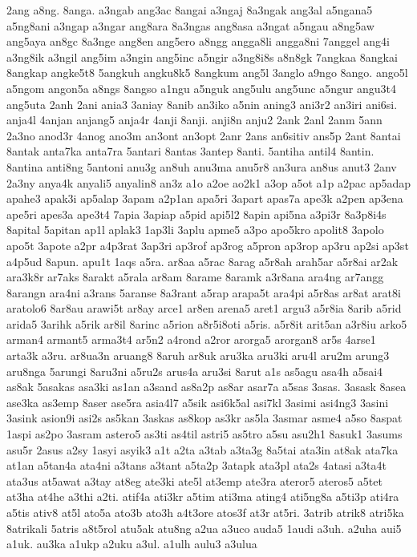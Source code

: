 {2ang a8ng. 8anga. a3ngab ang3ac 8angai a3ngaj 8a3ngak ang3al a5ngana5
a5ng8ani a3ngap a3ngar ang8ara 8a3ngas ang8asa a3ngat a5ngau a8ng5aw
ang5aya an8gc 8a3nge ang8en ang5ero a8ngg angga8li angga8ni 7anggel ang4i
a3ng8ik a3ngil ang5im a3ngin ang5inc a5ngir a3ng8i8s a8n8gk 7angkaa
8angkai 8angkap angke5t8 5angkuh angku8k5 8angkum ang5l 3anglo a9ngo
8ango. ango5l a5ngom angon5a a8ngs 8angso a1ngu a5nguk ang5ulu ang5unc
a5ngur angu3t4 ang5uta 2anh 2ani ania3 3aniay 8anib an3iko a5nin aning3
ani3r2 an3iri ani6si. anja4l 4anjan anjang5 anja4r 4anji 8anji. anji8n
anju2 2ank 2anl 2anm 5ann 2a3no anod3r 4anog ano3m an3ont an3opt 2anr 2ans
an6sitiv ans5p 2ant 8antai 8antak anta7ka anta7ra 5antari 8antas 3antep
8anti. 5antiha antil4 8antin. 8antina anti8ng 5antoni anu3g an8uh anu3ma
anu5r8 an3ura an8us anut3 2anv 2a3ny anya4k anyali5 anyalin8 an3z a1o a2oe
ao2k1 a3op a5ot a1p a2pac ap5adap apahe3 apak3i ap5alap 3apam a2p1an
apa5ri 3apart apas7a ape3k a2pen ap3ena ape5ri apes3a ape3t4 7apia 3apiap
a5pid api5l2 8apin api5na a3pi3r 8a3p8i4s 8apital 5apitan ap1l aplak3
1ap3li 3aplu apme5 a3po apo5kro apolit8 3apolo apo5t 3apote a2pr a4p3rat
3ap3ri ap3rof ap3rog a5pron ap3rop ap3ru ap2si ap3st a4p5ud 8apun. apu1t
1aqs a5ra. ar8aa a5rac 8arag a5r8ah arah5ar a5r8ai ar2ak ara3k8r ar7aks
8arakt a5rala ar8am 8arame 8aramk a3r8ana ara4ng ar7angg 8arangn ara4ni
a3rans 5aranse 8a3rant a5rap arapa5t ara4pi a5r8as ar8at arat8i aratolo6
8ar8au arawi5t ar8ay arce1 ar8en arena5 aret1 argu3 a5r8ia 8arib a5rid
arida5 3arihk a5rik ar8il 8arinc a5rion a8r5i8oti a5ris. a5r8it arit5an
a3r8iu arko5 arman4 armant5 arma3t4 ar5n2 a4rond a2ror arorga5 arorgan8
ar5s 4arse1 arta3k a3ru. ar8ua3n aruang8 8aruh ar8uk aru3ka aru3ki aru4l
aru2m arung3 aru8nga 5arungi 8aru3ni a5ru2s arus4a aru3si 8arut a1s as5agu
asa4h a5sai4 as8ak 5asakas asa3ki as1an a3sand as8a2p as8ar asar7a a5sas
3asas. 3asask 8asea ase3ka as3emp 8aser ase5ra asia4l7 a5sik asi6k5al
asi7kl 3asimi asi4ng3 3asini 3asink asion9i asi2s as5kan 3askas as8kop
as3kr as5la 3asmar asme4 a5so 8aspat 1aspi as2po 3asram astero5 as3ti
as4til astri5 as5tro a5su asu2h1 8asuk1 3asums asu5r 2asus a2sy 1asyi
asyik3 a1t a2ta a3tab a3ta3g 8a5tai ata3in at8ak ata7ka at1an a5tan4a
ata4ni a3tans a3tant a5ta2p 3atapk ata3pl ata2s 4atasi a3ta4t ata3us
at5awat a3tay at8eg ate3ki ate5l at3emp ate3ra ateror5 ateros5 a5tet at3ha
at4he a3thi a2ti. atif4a ati3kr a5tim ati3ma ating4 ati5ng8a a5ti3p ati4ra
a5tis ativ8 at5l ato5a ato3b ato3h a4t3ore atos3f at3r at5ri. 3atrib
atrik8 atri5ka 8atrikali 5atris a8t5rol atu5ak atu8ng a2ua a3uco auda5
1audi a3uh. a2uha aui5 a1uk. au3ka a1ukp a2uku a3ul. a1ulh aulu3 a3ulua
}
